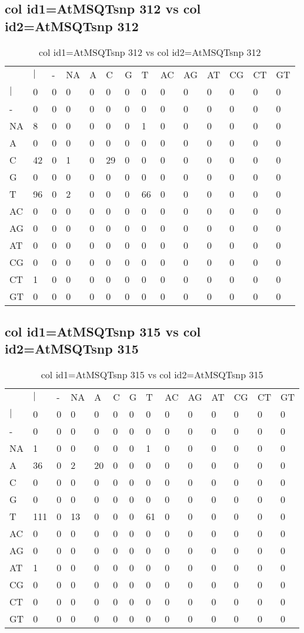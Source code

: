 \subsection{col id1=AtMSQTsnp 312 vs col id2=AtMSQTsnp 312}
\begin{center}
\begin{longtable}{|l|l|l|l|l|l|l|l|l|l|l|l|l|l|}
\caption{col id1=AtMSQTsnp 312 vs col id2=AtMSQTsnp 312} \label{table_dm658}\\
\hline
\\
\hline
&$|$&-&NA&A&C&G&T&AC&AG&AT&CG&CT&GT\\
$|$&0&0&0&0&0&0&0&0&0&0&0&0&0\\
-&0&0&0&0&0&0&0&0&0&0&0&0&0\\
NA&8&0&0&0&0&0&1&0&0&0&0&0&0\\
A&0&0&0&0&0&0&0&0&0&0&0&0&0\\
C&42&0&1&0&29&0&0&0&0&0&0&0&0\\
G&0&0&0&0&0&0&0&0&0&0&0&0&0\\
T&96&0&2&0&0&0&66&0&0&0&0&0&0\\
AC&0&0&0&0&0&0&0&0&0&0&0&0&0\\
AG&0&0&0&0&0&0&0&0&0&0&0&0&0\\
AT&0&0&0&0&0&0&0&0&0&0&0&0&0\\
CG&0&0&0&0&0&0&0&0&0&0&0&0&0\\
CT&1&0&0&0&0&0&0&0&0&0&0&0&0\\
GT&0&0&0&0&0&0&0&0&0&0&0&0&0\\
\hline
\end{longtable}
\end{center}

\subsection{col id1=AtMSQTsnp 315 vs col id2=AtMSQTsnp 315}
\begin{center}
\begin{longtable}{|l|l|l|l|l|l|l|l|l|l|l|l|l|l|}
\caption{col id1=AtMSQTsnp 315 vs col id2=AtMSQTsnp 315} \label{table_dm660}\\
\hline
\\
\hline
&$|$&-&NA&A&C&G&T&AC&AG&AT&CG&CT&GT\\
$|$&0&0&0&0&0&0&0&0&0&0&0&0&0\\
-&0&0&0&0&0&0&0&0&0&0&0&0&0\\
NA&1&0&0&0&0&0&1&0&0&0&0&0&0\\
A&36&0&2&20&0&0&0&0&0&0&0&0&0\\
C&0&0&0&0&0&0&0&0&0&0&0&0&0\\
G&0&0&0&0&0&0&0&0&0&0&0&0&0\\
T&111&0&13&0&0&0&61&0&0&0&0&0&0\\
AC&0&0&0&0&0&0&0&0&0&0&0&0&0\\
AG&0&0&0&0&0&0&0&0&0&0&0&0&0\\
AT&1&0&0&0&0&0&0&0&0&0&0&0&0\\
CG&0&0&0&0&0&0&0&0&0&0&0&0&0\\
CT&0&0&0&0&0&0&0&0&0&0&0&0&0\\
GT&0&0&0&0&0&0&0&0&0&0&0&0&0\\
\hline
\end{longtable}
\end{center}

